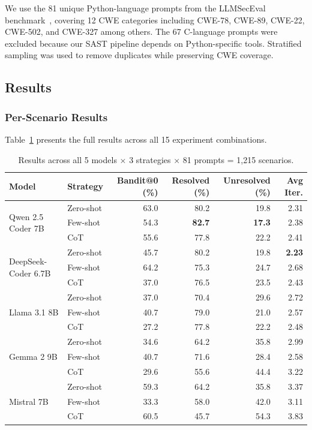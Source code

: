 \documentclass[runningheads]{llncs}
\begin{document}
We use the 81 unique Python-language prompts from the LLMSecEval benchmark~\cite{tony2023llmseceval}, covering 12 CWE categories including CWE-78, CWE-89, CWE-22, CWE-502, and CWE-327 among others. The 67 C-language prompts were excluded because our SAST pipeline depends on Python-specific tools. Stratified sampling was used to remove duplicates while preserving CWE coverage.

\subsection{Results}

\subsubsection{Per-Scenario Results}

Table~\ref{tab:main_results} presents the full results across all 15 experiment combinations.

\begin{table}[H]
\centering
\caption{Results across all 5 models $\times$ 3 strategies $\times$ 81 prompts = 1,215 scenarios.}
\label{tab:main_results}
\small
\begin{tabular}{llrrrr}
\toprule
\textbf{Model} & \textbf{Strategy} & \textbf{Bandit@0 (\%)} & \textbf{Resolved (\%)} & \textbf{Unresolved (\%)} & \textbf{Avg Iter.} \\
\midrule
\multirow{3}{*}{Qwen 2.5 Coder 7B}
  & Zero-shot & 63.0 & 80.2 & 19.8 & 2.31 \\
  & Few-shot  & 54.3 & \textbf{82.7} & \textbf{17.3} & 2.38 \\
  & CoT       & 55.6 & 77.8 & 22.2 & 2.41 \\
\midrule
\multirow{3}{*}{DeepSeek-Coder 6.7B}
  & Zero-shot & 45.7 & 80.2 & 19.8 & \textbf{2.23} \\
  & Few-shot  & 64.2 & 75.3 & 24.7 & 2.68 \\
  & CoT       & 37.0 & 76.5 & 23.5 & 2.43 \\
\midrule
\multirow{3}{*}{Llama 3.1 8B}
  & Zero-shot & 37.0 & 70.4 & 29.6 & 2.72 \\
  & Few-shot  & 40.7 & 79.0 & 21.0 & 2.57 \\
  & CoT       & 27.2 & 77.8 & 22.2 & 2.48 \\
\midrule
\multirow{3}{*}{Gemma 2 9B}
  & Zero-shot & 34.6 & 64.2 & 35.8 & 2.99 \\
  & Few-shot  & 40.7 & 71.6 & 28.4 & 2.58 \\
  & CoT       & 29.6 & 55.6 & 44.4 & 3.22 \\
\midrule
\multirow{3}{*}{Mistral 7B}
  & Zero-shot & 59.3 & 64.2 & 35.8 & 3.37 \\
  & Few-shot  & 33.3 & 58.0 & 42.0 & 3.11 \\
  & CoT       & 60.5 & 45.7 & 54.3 & 3.83 \\
\bottomrule
\end{tabular}
\end{table}
\end{document}

